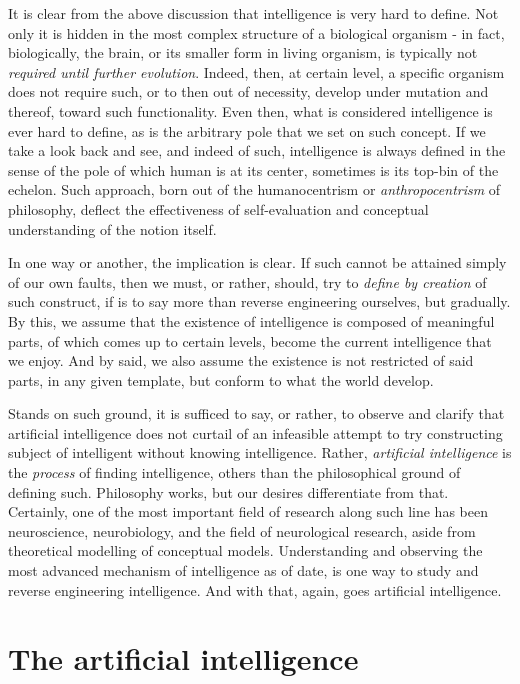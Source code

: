 It is clear from the above discussion that intelligence is very hard to define. Not only it is hidden in the most complex structure of a biological organism - in fact, biologically, the brain, or its smaller form in living organism, is typically not \textit{required until further evolution}. Indeed, then, at certain level, a specific organism does not require such, or to then out of necessity, develop under mutation and thereof, toward such functionality. Even then, what is considered intelligence is ever hard to define, as is the arbitrary pole that we set on such concept. If we take a look back and see, and indeed of such, intelligence is always defined in the sense of the pole of which human is at its center, sometimes is its top-bin of the echelon. Such approach, born out of the humanocentrism or \textit{anthropocentrism} of philosophy, deflect the effectiveness of self-evaluation and conceptual understanding of the notion itself. 

In one way or another, the implication is clear. If such cannot be attained simply of our own faults, then we must, or rather, should, try to \textit{define by creation} of such construct, if is to say more than reverse engineering ourselves, but gradually. By this, we assume that the existence of intelligence is composed of meaningful parts, of which comes up to certain levels, become the current intelligence that we enjoy. And by said, we also assume the existence is not restricted of said parts, in any given template, but conform to what the world develop. 

Stands on such ground, it is sufficed to say, or rather, to observe and clarify that artificial intelligence does not curtail of an infeasible attempt to try constructing subject of intelligent without knowing intelligence. Rather, \textit{artificial intelligence} is the \textit{process} of finding intelligence, others than the philosophical ground of defining such. Philosophy works, but our desires differentiate from that. Certainly, one of the most important field of research along such line has been neuroscience, neurobiology, and the field of neurological research, aside from theoretical modelling of conceptual models. Understanding and observing the most advanced mechanism of intelligence as of date, is one way to study and reverse engineering intelligence. And with that, again, goes artificial intelligence. 

\section{The artificial intelligence}

